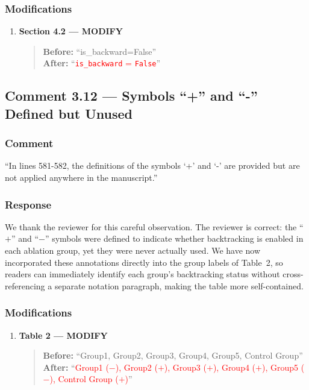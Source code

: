 \documentclass[11pt,a4paper]{article}
\begin{document}
\subsubsection{Modifications}
\begin{enumerate}
\item \textbf{Section 4.2 --- MODIFY}
\begin{quote}
\textbf{Before:} ``is\_backward=False''\\[4pt]
\textbf{After:} ``\textcolor{red}{\texttt{is\_backward} = \texttt{False}}''
\end{quote}
\end{enumerate}

\subsection{Comment 3.12 --- Symbols ``+'' and ``-'' Defined but Unused}

\subsubsection{Comment}
``In lines 581-582, the definitions of the symbols `+' and `-' are provided but are not applied anywhere in the manuscript.''

\subsubsection{Response}
We thank the reviewer for this careful observation.
The reviewer is correct: the ``$+$'' and ``$-$'' symbols were defined to indicate whether backtracking is enabled in each ablation group, yet they were never actually used.
We have now incorporated these annotations directly into the group labels of Table~2, so readers can immediately identify each group's backtracking status without cross-referencing a separate notation paragraph, making the table more self-contained.

\subsubsection{Modifications}

\begin{enumerate}
\item \textbf{Table 2 --- MODIFY}
\begin{quote}
\textbf{Before:} ``Group1, Group2, Group3, Group4, Group5, Control Group''\\[4pt]
\textbf{After:} ``\textcolor{red}{Group1 ($-$), Group2 ($+$), Group3 ($+$), Group4 ($+$), Group5 ($-$), Control Group ($+$)}''
\end{quote}
\end{enumerate}
\end{document}

